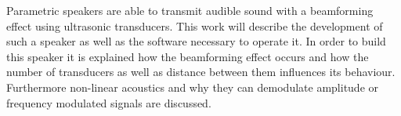 %

\emptydoublepage \thispagestyle{empty} \vspace*{1cm}

{\hfill\fontfamily{\sfdefault}\bfseries\fontsize{22}{22}\selectfont{Abstract}} \vspace*{1cm}

\noindent
Parametric speakers are able to transmit audible sound with a beamforming effect using ultrasonic transducers. This work will describe the development of such a speaker as well as the software necessary to operate it.\p
In order to build this speaker it is explained how the beamforming effect occurs and how the number of transducers as well as distance between them influences its behaviour. Furthermore non-linear acoustics and why they can demodulate amplitude or frequency modulated signals are discussed.\p